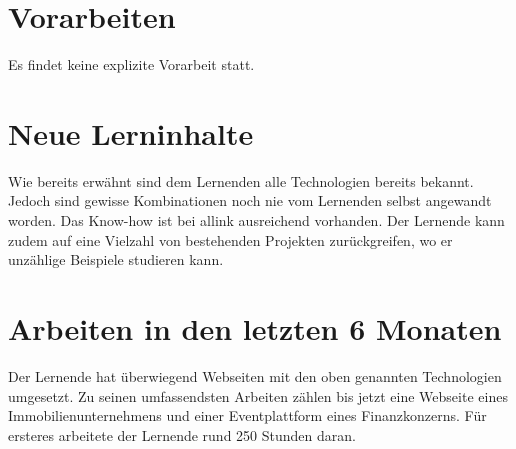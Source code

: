 \section{Vorarbeiten}
Es findet keine explizite Vorarbeit statt. 
    
\section{Neue Lerninhalte}
Wie bereits erwähnt sind dem Lernenden alle Technologien bereits bekannt. Jedoch sind gewisse Kombinationen noch nie vom Lernenden selbst angewandt worden. Das Know-how ist bei allink ausreichend vorhanden. Der Lernende kann zudem auf eine Vielzahl von bestehenden Projekten zurückgreifen, wo er unzählige Beispiele studieren kann. 
    
\section{Arbeiten in den letzten 6 Monaten}
Der Lernende hat überwiegend Webseiten mit den oben genannten Technologien umgesetzt. Zu seinen umfassendsten Arbeiten zählen bis jetzt eine Webseite eines Immobilienunternehmens und einer Eventplattform eines Finanzkonzerns. Für ersteres arbeitete der Lernende rund 250 Stunden daran. 
